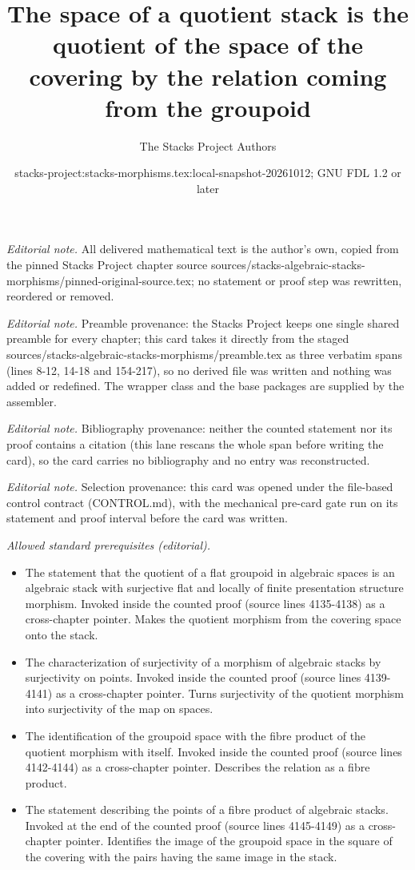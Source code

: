 \documentclass[10pt,a4paper]{amsart}
\title{The space of a quotient stack is the quotient of the space of the covering by the relation coming from the groupoid}
\author{The Stacks Project Authors}
\date{stacks-project:stacks-morphisms.tex:local-snapshot-20261012; GNU FDL 1.2 or later}
\theoremstyle{plain}
\theoremstyle{definition}
\theoremstyle{remark}
\numberwithin{equation}{subsection}
\begin{document}
\maketitle
\noindent\textit{Editorial note.} All delivered mathematical text is the author's own, copied from the pinned Stacks Project chapter source sources/stacks-algebraic-stacks-morphisms/pinned-original-source.tex; no statement or proof step was rewritten, reordered or removed.\par\medskip
\noindent\textit{Editorial note.} Preamble provenance: the Stacks Project keeps one single shared preamble for every chapter; this card takes it directly from the staged sources/stacks-algebraic-stacks-morphisms/preamble.tex as three verbatim spans (lines 8-12, 14-18 and 154-217), so no derived file was written and nothing was added or redefined. The wrapper class and the base packages are supplied by the assembler.\par\medskip
\noindent\textit{Editorial note.} Bibliography provenance: neither the counted statement nor its proof contains a citation (this lane rescans the whole span before writing the card), so the card carries no bibliography and no entry was reconstructed.\par\medskip
\noindent\textit{Editorial note.} Selection provenance: this card was opened under the file-based control contract (CONTROL.md), with the mechanical pre-card gate run on its statement and proof interval before the card was written.\par\medskip
\noindent\textit{Allowed standard prerequisites (editorial).}\begin{itemize}
\item The statement that the quotient of a flat groupoid in algebraic spaces is an algebraic stack with surjective flat and locally of finite presentation structure morphism. Invoked inside the counted proof (source lines 4135-4138) as a cross-chapter pointer. Makes the quotient morphism from the covering space onto the stack.
\item The characterization of surjectivity of a morphism of algebraic stacks by surjectivity on points. Invoked inside the counted proof (source lines 4139-4141) as a cross-chapter pointer. Turns surjectivity of the quotient morphism into surjectivity of the map on spaces.
\item The identification of the groupoid space with the fibre product of the quotient morphism with itself. Invoked inside the counted proof (source lines 4142-4144) as a cross-chapter pointer. Describes the relation as a fibre product.
\item The statement describing the points of a fibre product of algebraic stacks. Invoked at the end of the counted proof (source lines 4145-4149) as a cross-chapter pointer. Identifies the image of the groupoid space in the square of the covering with the pairs having the same image in the stack.
\end{itemize}\medskip
\end{document}
